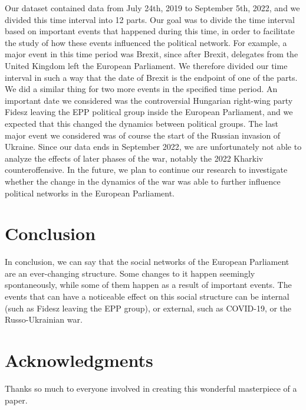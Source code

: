 \documentclass[lettersize,journal]{IEEEtran}
\begin{document}
Our dataset contained data from July 24th, 2019 to September 5th, 2022, and we divided this time interval into 12 parts. Our goal was to divide the time interval based on important events that happened during this time, in order to facilitate the study of how these events influenced the political network. For example, a major event in this time period was Brexit, since after Brexit, delegates from the United Kingdom left the European Parliament. We therefore divided our time interval in such a way that the date of Brexit is the endpoint of one of the parts. We did a similar thing for two more events in the specified time period. An important date we considered was the controversial Hungarian right-wing party Fidesz leaving the EPP political group inside the European Parliament, and we expected that this changed the dynamics between political groups. The last major event we considered was of course the start of the Russian invasion of Ukraine. Since our data ends in September 2022, we are unfortunately not able to analyze the effects of later phases of the war, notably the 2022 Kharkiv counteroffensive. In the future, we plan to continue our research to investigate whether the change in the dynamics of the war was able to further influence political networks in the European Parliament.

\section{Conclusion}

In conclusion, we can say that the social networks of the European Parliament are an ever-changing structure. Some changes to it happen seemingly spontaneously, while some of them happen as a result of important events. The events that can have a noticeable effect on this social structure can be internal (such as Fidesz leaving the EPP group), or external, such as COVID-19, or the Russo-Ukrainian war.

\section*{Acknowledgments}

Thanks so much to everyone involved in creating this wonderful masterpiece of a paper.
\end{document}

